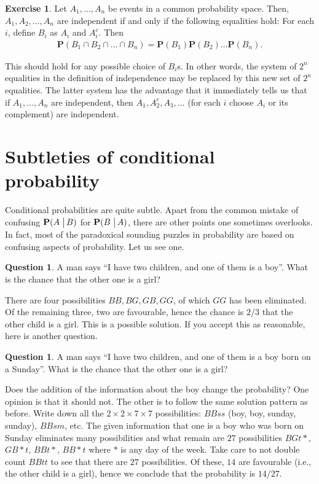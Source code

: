 \documentclass[preprint,  11pt]{amsart}
\newcommand{\para}[1]{\vspace{4mm}\noindent{\bfseries #1:}}
\theoremstyle{plain} %
\theoremstyle{definition} %
\newtheorem{question}[theorem]{Question}
\newtheorem{exercise}[theorem]{Exercise}
\begin{document}
\begin{exercise} Let $A_{1},\ldots ,A_{n}$ be events in a common probability space. Then, $A_{1}, A_{2},\ldots ,A_{n}$ are independent if and only if the following equalities hold: For each $i$, define $B_{i}$ as $A_{i}$ and $A_{i}^{c}$. Then
\[\begin{aligned}
\mathbf{P}(B_{1}\cap B_{2}\cap \ldots \cap B_{n})=\mathbf{P}(B_{1})\mathbf{P}(B_{2})\ldots \mathbf{P}(B_{n}).
\end{aligned}\]
\end{exercise}
\para{Note} This should hold for any possible choice of $B_{i}$s. In other words, the system of $2^{n}$ equalities in the definition of independence may be replaced by this new set of $2^{n}$ equalities. The latter system has the advantage that it immediately tells us that if $A_{1},\ldots ,A_{n}$ are independent, then $A_{1},A_{2}^{c}, A_{3},\ldots $ (for each $i$ choose $A_{i}$ or its complement) are independent.

\section{Subtleties of conditional probability}
Conditional probabilities are quite subtle. Apart from the common mistake of confusing $\mathbf{P}(A\left.\vphantom{\hbox{\large (}}\right| B)$ for $\mathbf{P}(B\left.\vphantom{\hbox{\large (}}\right| A)$, there are other points one sometimes overlooks. In fact, most of the paradoxical sounding puzzles in probability are based on confusing aspects of probability. Let us see one.

\begin{question} A man says ``I have two children, and one of them is a boy''. What is the chance that the other one is a girl?
\end{question}
There are four possibilities $BB, BG,GB,GG$, of which $GG$ has been eliminated. Of the remaining three, two are favourable, hence the chance is $2/3$ that the other child is a girl. This is a possible solution. If you accept this as reasonable, here is another question.


\begin{question} A man says ``I have two children, and one of them is a boy born on a Sunday''. What is the chance that the other one is a girl?
\end{question}
Does the addition of the information about the boy change the probability? One opinion is that it should not. The other is to follow the same solution pattern as before. Write down all the $2\times2\times7\times7$ possibilities: $BBss$ (boy, boy, sunday, sunday), $BBsm$, etc. The given information that one is a boy who was born on Sunday eliminates many possibilities and what remain are $27$ possibilities $BGt*$, $GB*t$, $BBt*$, $BB*t$ where $*$ is any day of the week. Take care to not double count $BBtt$ to see that there are $27$ possibilities. Of these, $14$ are favourable (i.e., the other child is a girl), hence we conclude that the probability is $14/27$.
\end{document}
